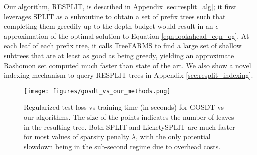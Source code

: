 Our algorithm, RESPLIT, is described in Appendix \ref{sec:resplit_alg}; it first leverages SPLIT as a subroutine to obtain a set of prefix trees such that completing them greedily up to the depth budget would result in an $\epsilon$ approximation of the optimal solution to Equation \ref{eqn:lookahead_eqn_og}. At each leaf of each prefix tree, it calls TreeFARMS \cite{xin2022treefarms} to find a large set of shallow subtrees that are at least as good as being greedy, yielding an approximate Rashomon set computed much faster than state of the art. We also show a novel indexing mechanism to query RESPLIT trees in Appendix \ref{sec:resplit_indexing}.
\begin{figure*}[ht]
    \centering
    \texttt{[image: figures/gosdt\_vs\_our\_methods.png]}
    \caption{Regularized test loss vs training time (in seconds) for GOSDT \citep{gosdt_guesses} vs our algorithms. The size of the points indicates the number of leaves in the resulting tree. Both SPLIT and LicketySPLIT are much faster for most values of sparsity penalty $\lambda$, with the only potential slowdown being in the sub-second regime due to overhead costs. }
    \label{fig:gosdt_vs_lookahead}
\end{figure*}